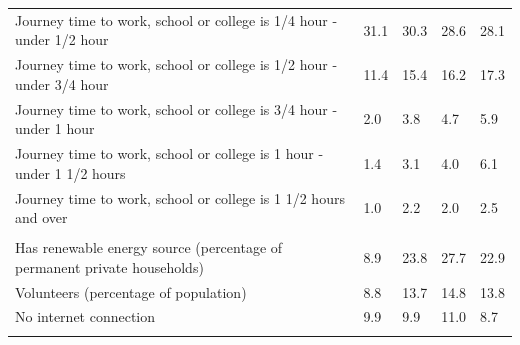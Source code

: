 \documentclass{article}
\begin{document}
\begin{table}[h]
\begin{tabular}{KTTTT}
Journey time to work, school or college is 1/4 hour - under 1/2 hour & 31.1& 30.3& 28.6& 28.1\\
Journey time to work, school or college is 1/2 hour - under 3/4 hour & 11.4& 15.4& 16.2& 17.3\\
Journey time to work, school or college is 3/4 hour - under 1 hour & 2.0& 3.8& 4.7& 5.9\\
Journey time to work, school or college is 1 hour - under 1 1/2 hours & 1.4& 3.1& 4.0& 6.1\\
Journey time to work, school or college is 1 1/2 hours and over & 1.0& 2.2& 2.0& 2.5\\
\hline
    \\ 
    \hline
Has renewable energy source (percentage of permanent private households) &  8.9& 23.8& 27.7& 22.9\\
    \hline
Volunteers (percentage of population) &  8.8& 13.7& 14.8& 13.8\\
    \hline
No internet connection&  9.9&  9.9& 11.0&  8.7\\
\hline
\end{tabular}
\end{table}
\end{document}
